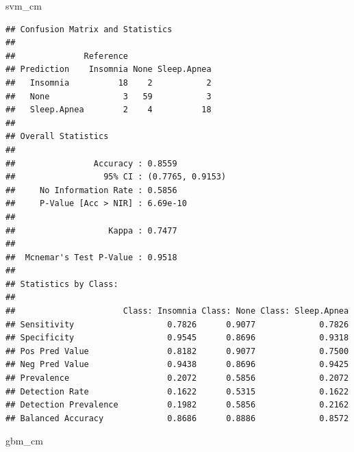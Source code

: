 \documentclass[
]{article}
\newenvironment{Shaded}{\begin{snugshade}}{\end{snugshade}}
\newcommand{\NormalTok}[1]{#1}
\begin{document}
\begin{Shaded}
\begin{Highlighting}[]
\NormalTok{svm\_cm}
\end{Highlighting}
\end{Shaded}

\begin{verbatim}
## Confusion Matrix and Statistics
## 
##              Reference
## Prediction    Insomnia None Sleep.Apnea
##   Insomnia          18    2           2
##   None               3   59           3
##   Sleep.Apnea        2    4          18
## 
## Overall Statistics
##                                           
##                Accuracy : 0.8559          
##                  95% CI : (0.7765, 0.9153)
##     No Information Rate : 0.5856          
##     P-Value [Acc > NIR] : 6.69e-10        
##                                           
##                   Kappa : 0.7477          
##                                           
##  Mcnemar's Test P-Value : 0.9518          
## 
## Statistics by Class:
## 
##                      Class: Insomnia Class: None Class: Sleep.Apnea
## Sensitivity                   0.7826      0.9077             0.7826
## Specificity                   0.9545      0.8696             0.9318
## Pos Pred Value                0.8182      0.9077             0.7500
## Neg Pred Value                0.9438      0.8696             0.9425
## Prevalence                    0.2072      0.5856             0.2072
## Detection Rate                0.1622      0.5315             0.1622
## Detection Prevalence          0.1982      0.5856             0.2162
## Balanced Accuracy             0.8686      0.8886             0.8572
\end{verbatim}

\begin{Shaded}
\begin{Highlighting}[]
\NormalTok{gbm\_cm}
\end{Highlighting}
\end{Shaded}
\end{document}
